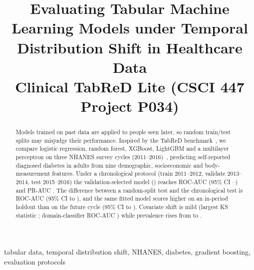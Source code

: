 \documentclass[conference]{IEEEtran}
\begin{document}
\title{Evaluating Tabular Machine Learning Models under Temporal Distribution Shift in Healthcare Data\\
\large Clinical TabReD Lite (CSCI 447 Project P034)}

\author{
}

\maketitle

\begin{abstract}
Models trained on past data are applied to people seen later, so random train/test splits may
misjudge their performance. Inspired by the TabReD benchmark~\cite{rubachev2024tabred}, we compare
logistic regression, random forest, XGBoost, LightGBM and a multilayer perceptron on three NHANES
survey cycles (2011--2016)~\cite{nhanes}, predicting self-reported diagnosed diabetes in
 adults from nine demographic, socioeconomic and body-measurement features. Under a
chronological protocol (train 2011--2012, validate 2013--2014, test 2015--2016) the
validation-selected model () reaches ROC-AUC 
(95\% CI --) and PR-AUC
. The difference between a random-split test and the chronological test
is  ROC-AUC (95\% CI 
to ), and the same fitted model scores
 higher on an in-period holdout than on the future cycle (95\% CI
 to ). Covariate shift is mild
(largest KS statistic ; domain-classifier ROC-AUC ) while
prevalence rises from  to .
\end{abstract}

\begin{IEEEkeywords}
tabular data, temporal distribution shift, NHANES, diabetes, gradient boosting, evaluation protocols
\end{IEEEkeywords}
\end{document}
